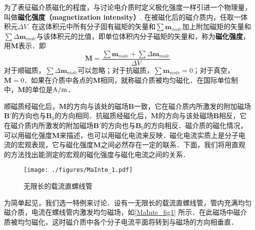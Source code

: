 
为了表征磁介质磁化的程度，与讨论电介质时定义极化强度一样引进一个物理量，叫做\textbf{磁化强度（magnetization intensity）}. 在被磁化后的磁介质内，任取一体积元$\Delta V$. 在这体积元中所有分子固有磁矩的矢量和$\sum \mathbf{m}_{mole}$加上附加磁矩的矢量和$\sum \Delta\mathbf{m}_{mole}$与该体积元的比值，即单位体积内分子磁矩的矢量和，称为\textbf{磁化强度}，用$\mathbf M$表示．即
\begin{equation}\label{MaInte_eq2}
\mathbf M=\frac{\sum \mathbf m_{mole}+\sum \Delta \mathbf m_{mole}}{\Delta V}
\end{equation}
对于顺磁质，$\sum \Delta\mathbf{m}_{mole}$可以忽略；对于抗磁质，$\sum \mathbf{m}_{mole}=0$；对于真空，$\mathbf M=0$．如果在介质中各点的$\mathbf M $相同，就称磁介质被均匀磁化．在国际单位制中，$\mathbf M$的单位是$\rm A/m$．

顺磁质经磁化后，$\mathbf M $的方向与该处的磁场$\mathbf B $一致，它在磁介质内所激发的附加磁场$\mathbf B' $的方向也与$\mathbf B_0$的方向相同．抗磁质经磁化后，$\mathbf M $的方向与该处磁场$\mathbf B $相反，它在磁介质内所激发的附加磁场$\mathbf B' $的方向也与$\mathbf B_0 $的方向相反．磁介质的磁化情况，可以用磁化强度$\mathbf M $来描述，也可以用磁化电流来反映．磁化电流实质上是分子电流的宏观表现，它与磁化强度$\mathbf M $之间必然存在一定的联系．下面，我们将用直观的方法找出能测定的宏观的磁化强度与磁化电流之间的关系．
\begin{figure}[ht]
\centering
\texttt{[image: ./figures/MaInte\_1.pdf]}
\caption{无限长的载流直螺线管} \label{MaInte_fig1}
\end{figure}
为简单起见，我们选一特例来讨论．设有一无限长的载流直螺线管，管内充满均匀磁介质，电流在螺线管内激发均匀磁场，如\autoref{MaInte_fig1} 所示．在此磁场中磁介质被均匀磁化，这时磁介质中各个分子电流平面将转到与磁场的方向相垂直．

